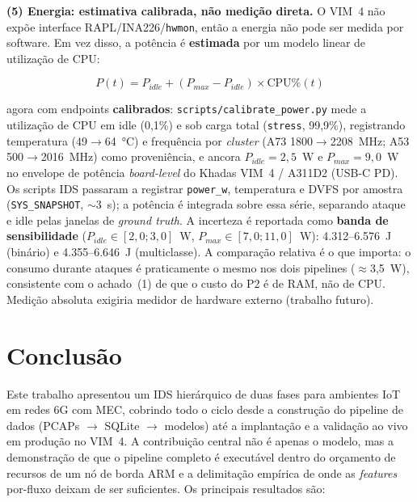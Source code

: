 \documentclass[12pt]{article}
\begin{document}
\textbf{(5) Energia: estimativa calibrada, não medição direta.} O VIM~4 não
expõe interface RAPL/INA226/\texttt{hwmon}, então a energia não pode ser medida
por software. Em vez disso, a potência é \textbf{estimada} por um modelo linear
de utilização de CPU:

\begin{equation}
P(t) = P_{idle} + (P_{max} - P_{idle}) \times \text{CPU\%}(t)
\label{eq:power}
\end{equation}

agora com endpoints \textbf{calibrados}: \texttt{scripts/calibrate\_power.py}
mede a utilização de CPU em idle (0,1\%) e sob carga total (\texttt{stress},
99,9\%), registrando temperatura (49$\rightarrow$64~°C) e frequência por
\textit{cluster} (A73 1800$\rightarrow$2208~MHz; A53 500$\rightarrow$2016~MHz)
como proveniência, e ancora $P_{idle} = 2{,}5$~W e $P_{max} = 9{,}0$~W no
envelope de potência \textit{board-level} do Khadas VIM~4 / A311D2 (USB-C PD).
Os scripts IDS passaram a registrar \texttt{power\_w}, temperatura e DVFS por
amostra (\texttt{SYS\_SNAPSHOT}, $\sim$3~s); a potência é integrada sobre essa
série, separando ataque e idle pelas janelas de \textit{ground truth}. A
incerteza é reportada como \textbf{banda de sensibilidade} ($P_{idle} \in
[2{,}0;3{,}0]$~W, $P_{max} \in [7{,}0;11{,}0]$~W): 4.312--6.576~J (binário) e
4.355--6.646~J (multiclasse). A comparação relativa é o que importa: o consumo
durante ataques é praticamente o mesmo nos dois pipelines ($\approx$3,5~W),
consistente com o achado~(1) de que o custo do P2 é de RAM, não de CPU. Medição
absoluta exigiria medidor de hardware externo (trabalho futuro).

\section{Conclusão}

Este trabalho apresentou um IDS hierárquico de duas fases para ambientes IoT
em redes 6G com MEC, cobrindo todo o ciclo desde a construção do pipeline de
dados (PCAPs $\rightarrow$ SQLite $\rightarrow$ modelos) até a implantação e a
validação ao vivo em produção no VIM~4. A contribuição central não é apenas o
modelo, mas a demonstração de que o pipeline completo é executável dentro do
orçamento de recursos de um nó de borda ARM e a delimitação empírica de onde as
\textit{features} por-fluxo deixam de ser suficientes. Os principais resultados
são:
\end{document}
